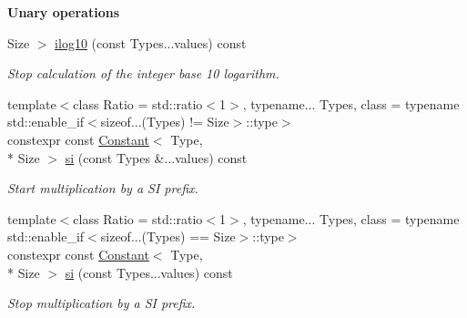 \begin{Indent}{\bf Unary operations}
\begin{DoxyCompactItemize}
Size $>$ \hyperlink{exceptionmagrathea_1_1Constant_a9463599d224e99b9f8f86b2678b09374}{ilog10} (const Types...\-values) const 
\begin{DoxyCompactList}\small\item\em Stop calculation of the integer base 10 logarithm. \end{DoxyCompactList}\item 
{\footnotesize template$<$class Ratio  = std\-::ratio$<$1$>$, typename... Types, class  = typename std\-::enable\-\_\-if$<$sizeof...(\-Types) != Size$>$\-::type$>$ }\\constexpr const \hyperlink{exceptionmagrathea_1_1Constant}{Constant}$<$ Type, \\*
Size $>$ \hyperlink{exceptionmagrathea_1_1Constant_a54abd8b303f3c5ab9f9ac512d5a7ee23}{si} (const Types \&...values) const 
\begin{DoxyCompactList}\small\item\em Start multiplication by a S\-I prefix. \end{DoxyCompactList}\item 
{\footnotesize template$<$class Ratio  = std\-::ratio$<$1$>$, typename... Types, class  = typename std\-::enable\-\_\-if$<$sizeof...(\-Types) == Size$>$\-::type$>$ }\\constexpr const \hyperlink{exceptionmagrathea_1_1Constant}{Constant}$<$ Type, \\*
Size $>$ \hyperlink{exceptionmagrathea_1_1Constant_a260a07f1209ebdd536f4b12a7744e671}{si} (const Types...\-values) const 
\begin{DoxyCompactList}\small\item\em Stop multiplication by a S\-I prefix. \end{DoxyCompactList}\end{DoxyCompactItemize}
\end{Indent}
